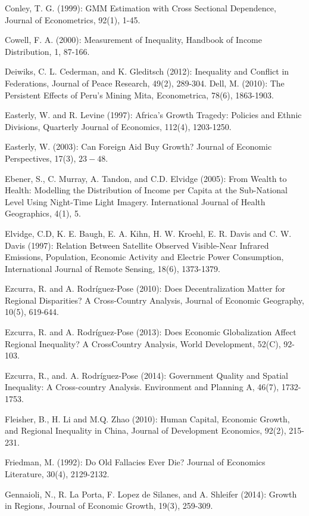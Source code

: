 \documentclass[10pt]{article}
\begin{document}
Conley, T. G. (1999): GMM Estimation with Cross Sectional Dependence, Journal of Econometrics, 92(1), 1-45.

Cowell, F. A. (2000): Measurement of Inequality, Handbook of Income Distribution, 1, 87-166.

Deiwiks, C. L. Cederman, and K. Gleditsch (2012): Inequality and Conflict in Federations, Journal of Peace Research, 49(2), 289-304. Dell, M. (2010): The Persistent Effects of Peru's Mining Mita, Econometrica, 78(6), 1863-1903.

Easterly, W. and R. Levine (1997): Africa's Growth Tragedy: Policies and Ethnic Divisions, Quarterly Journal of Economics, 112(4), 1203-1250.

Easterly, W. (2003): Can Foreign Aid Buy Growth? Journal of Economic Perspectives, 17(3), $23-48$.

Ebener, S., C. Murray, A. Tandon, and C.D. Elvidge (2005): From Wealth to Health: Modelling the Distribution of Income per Capita at the Sub-National Level Using Night-Time Light Imagery. International Journal of Health Geographics, 4(1), 5.

Elvidge, C.D, K. E. Baugh, E. A. Kihn, H. W. Kroehl, E. R. Davis and C. W. Davis (1997): Relation Between Satellite Observed Visible-Near Infrared Emissions, Population, Economic Activity and Electric Power Consumption, International Journal of Remote Sensing, 18(6), 1373-1379.

Ezcurra, R. and A. Rodríguez-Pose (2010): Does Decentralization Matter for Regional Disparities? A Cross-Country Analysis, Journal of Economic Geography, 10(5), 619-644.

Ezcurra, R. and A. Rodríguez-Pose (2013): Does Economic Globalization Affect Regional Inequality? A CrossCountry Analysis, World Development, 52(C), 92-103.

Ezcurra, R., and. A. Rodríguez-Pose (2014): Government Quality and Spatial Inequality: A Cross-country Analysis. Environment and Planning A, 46(7), 1732-1753.

Fleisher, B., H. Li and M.Q. Zhao (2010): Human Capital, Economic Growth, and Regional Inequality in China, Journal of Development Economics, 92(2), 215-231.

Friedman, M. (1992): Do Old Fallacies Ever Die? Journal of Economics Literature, 30(4), 2129-2132.

Gennaioli, N., R. La Porta, F. Lopez de Silanes, and A. Shleifer (2014): Growth in Regions, Journal of Economic Growth, 19(3), 259-309.
\end{document}
